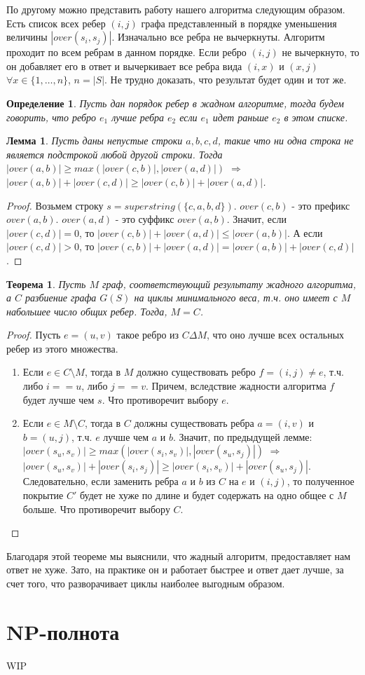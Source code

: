 \documentclass[a4paper,10pt]{article}
\newtheorem{theorem}{Теорема}
\newtheorem{lemma}{Лемма}
\newtheorem{definition}{Определение}
\begin{document}
По другому можно представить работу нашего алгоритма следующим образом.
Есть список всех ребер $(i, j)$ графа представленный в порядке уменьшения величины $|over(s_i, s_j)|$.
Изначально все ребра не вычеркнуты.
Алгоритм проходит по всем ребрам в данном порядке. Если ребро $(i, j)$ не вычеркнуто, 
то он добавляет его в ответ и вычеркивает все ребра вида $(i, x)$ и $(x, j)$ $\forall x \in \{ 1, \dots, n \}$, $n = |S|$.
Не трудно доказать, что результат будет один и тот же.

\begin{definition}
Пусть дан порядок ребер в жадном алгоритме, тогда будем говорить, что ребро $e_1$ лучше ребра $e_2$ если $e_1$ идет раньше $e_2$ в этом списке.
\end{definition}

\begin{lemma}
Пусть даны непустые строки $a,b,c,d$, такие что ни одна строка не является подстрокой любой другой строки.
Тогда $|over(a, b)| \geq max( |over(c, b)|, |over(a, d)| )$ $\Rightarrow$ $|over(a, b)| + |over(c, d)| \geq |over(c, b)| + |over(a, d)|$.
\end{lemma}

\begin{proof}
Возьмем строку $s = superstring(\{ c, a, b, d \})$.
$over(c, b)$ - это префикс $over(a, b)$. $over(a, d)$ - это суффикс $over(a, b)$.
Значит, если $|over(c, d)| = 0$, то $|over(c, b)| + |over(a, d)| \leq |over(a, b)|$.
А если $|over(c, d)| > 0$, то $|over(c, b)| + |over(a, d)| = |over(a, b)| + |over(c, d)|$.
\end{proof}

\begin{theorem}
Пусть $M$ граф, соответствующий результату жадного алгоритма, а $C$ разбиение графа $G(S)$ на циклы минимального веса, т.ч. оно имеет с $M$ набольшее число общих ребер.
Тогда, $M = C$.
\end{theorem}

\begin{proof}
Пусть $e = (u, v)$ такое ребро из $C \Delta M$, что оно лучше всех остальных ребер из этого множества.
\begin{enumerate}
\item Если $e \in C \setminus M $, тогда в $M$ должно существовать ребро $f = (i, j) \ne e$, т.ч. либо $i == u$, либо $j == v$.
Причем, вследствие жадности алгоритма $f$ будет лучше чем $s$. Что противоречит выбору $e$.
\item Если $e \in M \setminus C $, тогда в $C$ должны существовать ребра $a = (i, v)$ и $b = (u, j)$, т.ч. $e$ лучше чем $a$ и $b$.
Значит, по предыдущей лемме: $|over(s_u, s_v)| \geq max( |over(s_i, s_v)|, |over(s_u, s_j)| )$ $\Rightarrow$ 
$|over(s_u, s_v)| + |over(s_i, s_j)| \geq |over(s_i, s_v)| + |over(s_u, s_j)|$.
Следовательно, если заменить ребра $a$ и $b$ из $C$ на $e$ и $(i, j)$, то полученное покрытие $C'$ будет не хуже по длине и будет содержать на одно общее с $M$ больше.
Что противоречит выбору $C$.
\end{enumerate}
\end{proof}

Благодаря этой теореме мы выяснили, что жадный алгоритм, предоставляет нам ответ не хуже.
Зато, на практике он и работает быстрее и ответ дает лучше, за счет того, что разворачивает циклы наиболее выгодным образом.

\section{NP-полнота}

WIP
\end{document}
